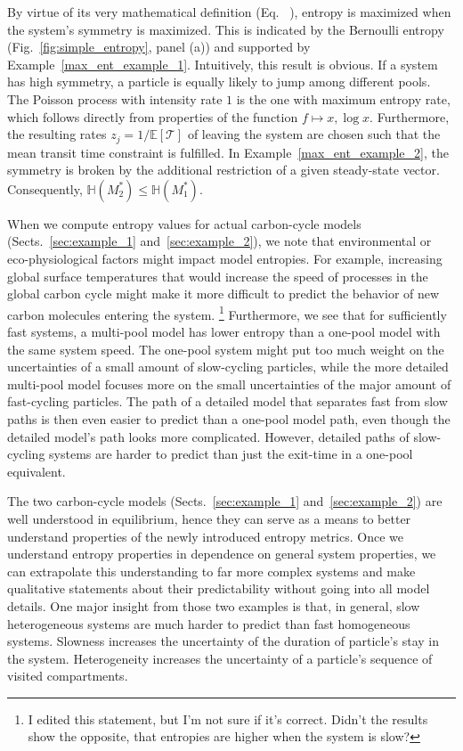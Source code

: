 \documentclass[smallextended]{svjour3}
\makeatletter
\renewcommand*{\eqref}[1]{%
  \hyperref[{#1}]{\textup{\tagform@{\ref*{#1}}}}%
}
\newcommand{\E}{\mathbb{E}}
\newcommand{\TT}{\mathcal{T}}
\renewcommand{\H}{\mathbb{H}}
\makeatother
\begin{document}
By virtue of its very mathematical definition (Eq.~\eqref{eqn:entropy}), entropy is maximized when the system's symmetry is maximized.
This is indicated by the Bernoulli entropy (Fig.~\ref{fig:simple_entropy}, panel (a)) and supported by Example~\ref{max_ent_example_1}.
Intuitively, this result is obvious.
If a system has high symmetry, a particle is equally likely to jump among different pools.
The Poisson process with intensity rate $1$ is the one with maximum entropy rate, which follows directly from properties of the function $f\mapsto x,\log x$.
Furthermore, the resulting rates $z_j = 1/\E\left[\TT\right]$ of leaving the system are chosen such that the mean transit time constraint is fulfilled. 
In Example~\ref{max_ent_example_2}, the symmetry is broken by the additional restriction of a given steady-state vector.
Consequently, $\H(M^\ast_2) \leq \H(M^\ast_1)$.

When we compute entropy values for actual carbon-cycle models (Sects.~\ref{sec:example_1} and~\ref{sec:example_2}), we note that environmental or eco-physiological factors might impact model entropies.
For example, increasing global surface temperatures that would increase the speed of processes in the global carbon cycle might make it more difficult to predict the behavior of new carbon molecules entering the system. \footnote{\color{red} I edited this statement, but I'm not sure if it's correct. Didn't the results show the opposite, that entropies are higher when the system is slow?}
Furthermore, we see that for sufficiently fast systems, a multi-pool model has lower entropy than a one-pool model with the same system speed.
The one-pool system might put too much weight on the uncertainties of a small amount of slow-cycling particles, while the more detailed multi-pool model focuses more on the small uncertainties of the major amount of fast-cycling particles.
The path of a detailed model that separates fast from slow paths is then even easier to predict than a one-pool model path, even though the detailed model's path looks more complicated.
However, detailed paths of slow-cycling systems are harder to predict than just the exit-time in a one-pool equivalent.

The two carbon-cycle models (Sects.~\ref{sec:example_1} and~\ref{sec:example_2}) are well understood in equilibrium, hence they can serve as a means to better understand properties of the newly introduced entropy metrics.
Once we understand entropy properties in dependence on general system properties, we can extrapolate this understanding to far more complex systems and make qualitative statements about their predictability without going into all model details.
One major insight from those two examples is that, in general, slow heterogeneous systems are much harder to predict than fast homogeneous systems.
Slowness increases the uncertainty of the duration of particle's stay in the system.
Heterogeneity increases the uncertainty of a particle's sequence of visited compartments.
\end{document}
